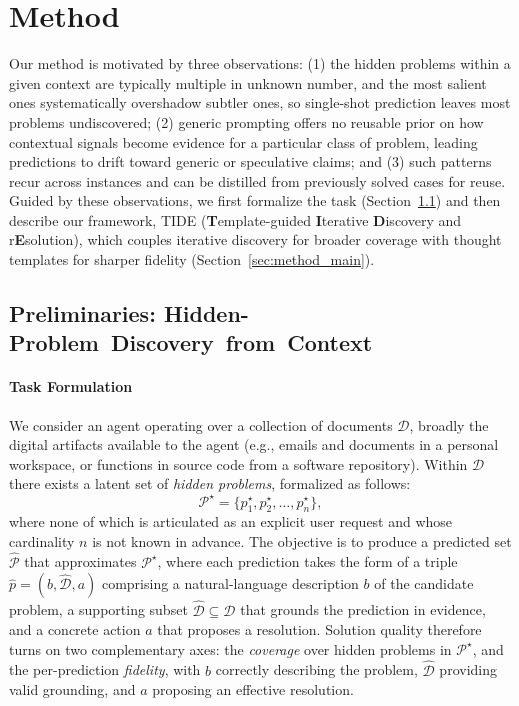 \documentclass{llmxive}
\begin{document}
\section{Method}

Our method is motivated by three observations:
(1) the hidden problems within a given context are typically multiple in unknown number, and the most salient ones systematically overshadow subtler ones, so single-shot prediction leaves most problems undiscovered;
(2) generic prompting offers no reusable prior on how contextual signals become evidence for a particular class of problem, leading predictions to drift toward generic or speculative claims; and
(3) such patterns recur across instances and can be distilled from previously solved cases for reuse.
Guided by these observations, we first formalize the task (Section~\ref{sec:preliminaries}) and then describe our framework, \textsc{TIDE} (\textbf{T}emplate-guided \textbf{I}terative \textbf{D}iscovery and r\textbf{E}solution), which couples iterative discovery for broader coverage with thought templates for sharper fidelity (Section~\ref{sec:method_main}).

\subsection{Preliminaries: Hidden-Problem~Discovery~from~Context}
\label{sec:preliminaries}

\paragraph{Task Formulation}
We consider an agent operating over a collection of documents $\mathcal{D}$, broadly the digital artifacts available to the agent (e.g., emails and documents in a personal workspace, or functions in source code from a software repository). Within $\mathcal{D}$ there exists a latent set of \emph{hidden problems}, formalized as follows:
\[
\mathcal{P}^{\star} = \{p_1^{\star}, p_2^{\star}, \dots, p_n^{\star}\},
\]
where none of which is articulated as an explicit user request and whose cardinality $n$ is not known in advance. The objective is to produce a predicted set $\hat{\mathcal{P}}$ that approximates $\mathcal{P}^{\star}$, where each prediction takes the form of a triple $\hat{p} = (b, \hat{\mathcal{D}}, a)$ comprising a natural-language description $b$ of the candidate problem, a supporting subset $\hat{\mathcal{D}} \subseteq \mathcal{D}$ that grounds the prediction in evidence, and a concrete action $a$ that proposes a resolution. Solution quality therefore turns on two complementary axes: the \textit{coverage} over hidden problems in $\mathcal{P}^{\star}$, and the per-prediction \textit{fidelity}, with $b$ correctly describing the problem, $\hat{\mathcal{D}}$ providing valid grounding, and $a$ proposing an effective resolution.
\end{document}
